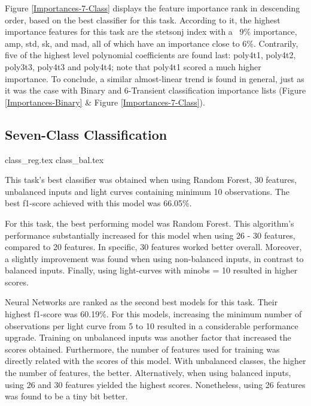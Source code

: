 \documentclass[a4paper,fleqn,usenatbib]{mnras}
\begin{document}
Figure \ref{Importances-7-Class} displays the feature importance rank in descending order, based on the best classifier for this task. 
According to it, the highest importance features for this task are the
stetson\textunderscore j index with a ~9\% importance, amp, std, sk, and mad, all of which have an importance close to 6\%. Contrarily, five of the highest level polynomial coefficients are found last: poly4\textunderscore t1, poly4\textunderscore t2, poly3\textunderscore t3, poly4\textunderscore t3 and poly4\textunderscore t4; note that poly4\textunderscore t1 scored a much higher importance. To conclude, a similar almost-linear trend is found in general, just as it was the case with Binary and 6-Transient classification importance lists (Figure \ref{Importances-Binary} \& Figure \ref{Importances-7-Class}).



\subsection{Seven-Class Classification}

{class_reg.tex}
{class_bal.tex}


This task's best classifier was obtained when using Random Forest, 30 features, unbalanced inputs and light curves containing minimum 10 observations. The best f1-score achieved with this model was 66.05\%.

For this task, the best performing model was Random Forest. This algorithm's performance substantially increased for this model when using 26 - 30 features, compared to 20 features. In specific, 30 features worked better overall. Moreover, a slightly improvement was found when using non-balanced inputs, in contrast to balanced inputs. Finally, using light-curves with min\textunderscore obs = 10 resulted in higher scores.

Neural Networks are ranked as the second best models for this task. Their highest f1-score was 60.19\%. For this models, increasing the minimum number of observations per light curve from 5 to 10 resulted in a considerable performance upgrade. Training on unbalanced inputs was another factor that increased the scores obtained. Furthermore, the number of features used for training was directly related with the scores of this model. With unbalanced classes, the higher the number of features, the better. Alternatively, when using balanced inputs, using 26 and 30 features yielded the highest scores. Nonetheless, using 26 features was found to be a tiny bit better.
\end{document}
